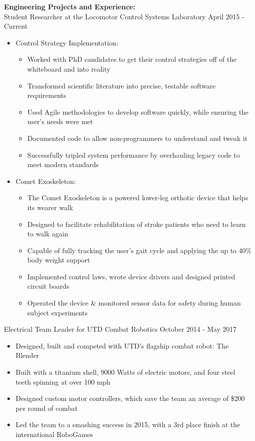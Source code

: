 \documentclass[11pt,english]{article}
\begin{document}
\vspace{0.75em}
\textbf{Engineering Projects and Experience:}\\
Student Researcher at the Locomotor Control Systems Laboratory
\hfill
April 2015 - Current
\begin{itemize}
    \item Control Strategy Implementation:
    \begin{itemize}
        \item Worked with PhD candidates to get their control strategies off of the whiteboard and into reality
        \item Transformed scientific literature into precise, testable software requirements
        \item Used Agile methodologies to develop software quickly, while ensuring the user’s needs were met
        \item Documented code to allow non-programmers to understand and tweak it
        \item Successfully tripled system performance by overhauling legacy code to meet modern standards
    \end{itemize}
    \item Comet Exoskeleton:
    \begin{itemize}
        \item The Comet Exoskeleton is a powered lower-leg orthotic device that helps its wearer walk
        \item Designed to facilitate rehabilitation of stroke patients who need to learn to walk again
        \item Capable of fully tracking the user’s gait cycle and applying the up to 40\% body weight support
        \item Implemented control laws, wrote device drivers and designed printed circuit boards
        \item Operated the device \& monitored sensor data for safety during human subject experiments
    \end{itemize}
\end{itemize}
\vspace{0.5em}
Electrical Team Leader for UTD Combat Robotics
\hfill
October 2014 - May 2017
\begin{itemize}
    \item Designed, built and competed with UTD’s flagship combat robot: The Blender
    \item Built with a titanium shell, 9000 Watts of electric motors, and four steel teeth spinning at over 100 mph
    \item Designed custom motor controllers, which save the team an average of \$200 per round of combat
    \item Led the team to a smashing success in 2015, with a 3rd place finish at the international RoboGames
\end{itemize}
\vspace{0.5em}
\end{document}
